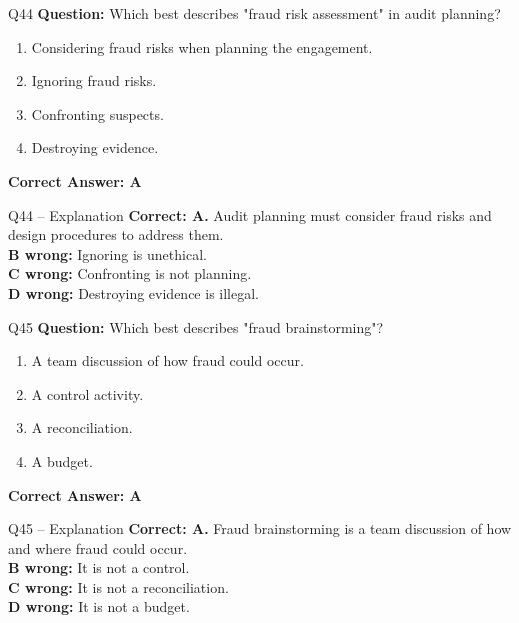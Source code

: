 \documentclass[aspectratio=169,10pt]{beamer}
\begin{document}
	\begin{frame}[t]{Q44}
		\small
		\textbf{Question:} Which best describes "fraud risk assessment" in audit planning?
		\begin{enumerate}[label=\Alph*.,itemsep=1pt,topsep=2pt]
			\item Considering fraud risks when planning the engagement.
			\item Ignoring fraud risks.
			\item Confronting suspects.
			\item Destroying evidence.
		\end{enumerate}
		\vspace{4pt}
		\textbf{Correct Answer: A}
	\end{frame}
	
	\begin{frame}[t]{Q44 -- Explanation}
		\small
		\textbf{Correct: A.} Audit planning must consider fraud risks and design procedures to address them. \\[4pt]
		\textbf{B wrong:} Ignoring is unethical. \\[2pt]
		\textbf{C wrong:} Confronting is not planning. \\[2pt]
		\textbf{D wrong:} Destroying evidence is illegal.
	\end{frame}
	
	\begin{frame}[t]{Q45}
		\small
		\textbf{Question:} Which best describes "fraud brainstorming"?
		\begin{enumerate}[label=\Alph*.,itemsep=1pt,topsep=2pt]
			\item A team discussion of how fraud could occur.
			\item A control activity.
			\item A reconciliation.
			\item A budget.
		\end{enumerate}
		\vspace{4pt}
		\textbf{Correct Answer: A}
	\end{frame}
	
	\begin{frame}[t]{Q45 -- Explanation}
		\small
		\textbf{Correct: A.} Fraud brainstorming is a team discussion of how and where fraud could occur. \\[4pt]
		\textbf{B wrong:} It is not a control. \\[2pt]
		\textbf{C wrong:} It is not a reconciliation. \\[2pt]
		\textbf{D wrong:} It is not a budget.
	\end{frame}
	
\end{document}
